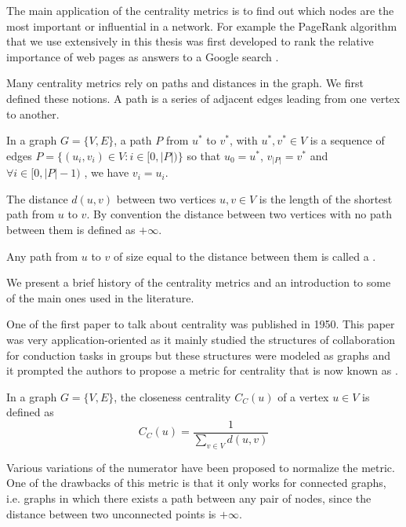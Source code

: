 The main application of the centrality metrics is to find out which nodes are the most important or influential in a network. For example the PageRank algorithm that we use extensively in this thesis was first developed to rank the relative importance of web pages as answers to a Google search \cite{pagerank}.

Many centrality metrics rely on paths and distances in the graph. We first defined these notions. A path is a series of adjacent edges leading from one vertex to another.
\begin{definition}[Path]
    In a graph $G = \{V, E\}$, a path $P$ from $u^*$ to $v^*$, with $u^*, v^* \in V$ is a sequence of edges $P = \{(u_i, v_i) \in V: i\in [0, |P|)\}$ so that $u_0 = u^*$, $v_{|P|} = v^*$ and $\forall i \in [0, |P|-1)$ , we have $v_i = u_i$.
\end{definition}

\begin{definition}
    The distance $d(u, v)$ between two vertices $u, v \in V$ is the length of the shortest path from $u$ to $v$. By convention the distance between two vertices with no path between them is defined as $+\infty$. 

    Any path from $u$ to $v$ of size equal to the distance between them is called a .
\end{definition}

We present a brief history of the centrality metrics and an introduction to some of the main ones used in the literature.

One of the first paper to talk about centrality was \cite{bavelas1950_firstCentrality} published in 1950. This paper was very application-oriented as it mainly studied the structures of collaboration for conduction tasks in groups but these structures were modeled as graphs and it prompted the authors to propose a metric for centrality that is now known as .
\begin{definition}
    In a graph $G = \{V, E\}$, the closeness centrality $C_C(u)$ of a vertex $u\in V$ is defined as
    \begin{equation}
        C_C(u) = \frac{1}{\sum_{v\in V} d(u, v)}
    \end{equation}
\end{definition}

Various variations of the numerator have been proposed to normalize the metric. One of the drawbacks of this metric is that it only works for connected graphs, i.e. graphs in which there exists a path between any pair of nodes, since the distance between two unconnected points is $+\infty$.

